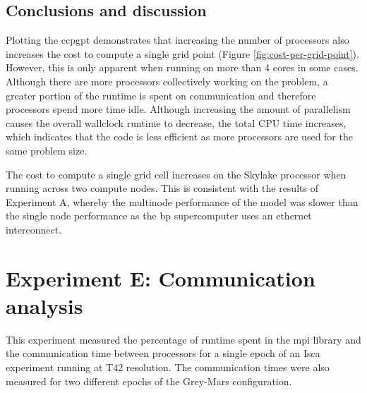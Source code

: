 \documentclass[a4paper,11pt]{report}
\begin{document}
\subsection{Conclusions and discussion}
Plotting the \gls{ccpgpt} demonstrates that increasing the number of processors also increases the cost to compute a single grid point (Figure \ref{fig:cost-per-grid-point}). However, this is only apparent when running on more than 4 cores in some cases. Although there are more processors collectively working on the problem, a greater portion of the runtime is spent on communication and therefore processors spend more time idle. Although increasing the amount of parallelism causes the overall wallclock runtime to decrease, the total CPU time increases, which indicates that the code is less efficient as more processors are used for the same problem size. 
\par
The cost to compute a single grid cell increases on the Skylake processor when running across two compute nodes. This is consistent with the results of Experiment A, whereby the multinode performance of the model was slower than the single node performance as the \gls{bp} supercomputer uses an ethernet interconnect.

\section{Experiment E: Communication analysis}
\label{sec:mpi-comms}
This experiment measured the percentage of runtime spent in the \gls{mpi} library and the communication time between processors for a single epoch of an Isca experiment running at T42 resolution. The communication times were also measured for two different epochs of the Grey-Mars configuration.
\end{document}
